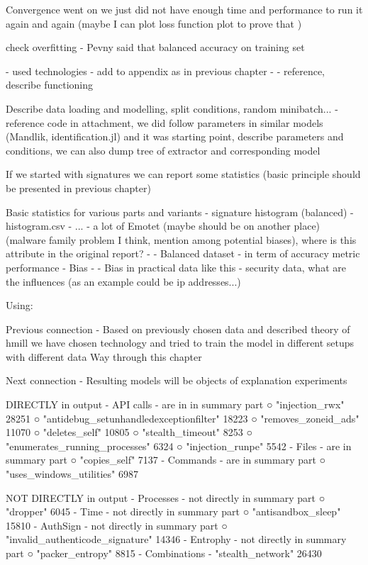 Convergence went on we just did not have enough time and performance to run it again and again (maybe I can plot loss function plot to prove that )

check overfitting - Pevny said that balanced accuracy on training set


- used technologies - add to appendix as in previous chapter
  - 
  - reference, describe functioning

Describe data loading and modelling, split conditions, random minibatch... - reference code in attachment, we did follow parameters in similar models (Mandlik, identification.jl) and it was starting point, describe parameters and conditions, we can also dump tree of extractor and corresponding model


If we started with signatures we can report some statistics (basic principle should be presented in previous chapter)

Basic statistics for various parts and variants
  - signature histogram (balanced) - histogram.csv
  - ...
  - a lot of Emotet (maybe should be on another place) (malware family problem I think, mention among potential biases), where is this attribute in the original report?
  - - Balanced dataset - in term of accuracy metric performance
  - Bias - - Bias in practical data like this - security data, what are the influences (as an example could be ip addresses...)

Using:




Previous connection
- Based on previously chosen data and described theory of hmill we have chosen technology and tried to train the model in different setups with different data
Way through this chapter

Next connection
- Resulting models will be objects of explanation experiments



DIRECTLY in output
	- API calls - are in in summary part
		○ "injection_rwx" 28251
		○ "antidebug_setunhandledexceptionfilter" 18223
		○ "removes_zoneid_ads" 11070
		○ "deletes_self" 10805
		○ "stealth_timeout" 8253
		○ "enumerates_running_processes" 6324
		○ "injection_runpe"  5542
  - Files - are in summary part
		○ "copies_self" 7137
	- Commands - are in summary part
		○ "uses_windows_utilities" 6987

NOT DIRECTLY in output
	- Processes - not directly in summary part
		○ "dropper"  6045
	- Time - not directly in summary part
		○ "antisandbox_sleep" 15810
	- AuthSign - not directly in summary part
		○ "invalid_authenticode_signature" 14346
	- Entrophy - not directly in summary part
		○ "packer_entropy" 8815
	- Combinations - 
    "stealth_network" 26430
